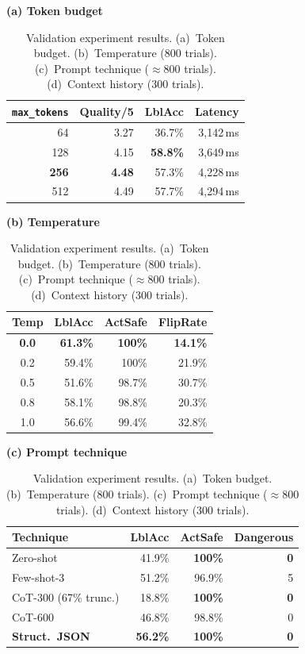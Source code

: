 \documentclass[journal]{IEEEtran}
\begin{document}
\begin{table}[t]
  \caption{Validation experiment results.
    (a)~Token budget. (b)~Temperature (800 trials).
    (c)~Prompt technique ($\approx$800 trials).
    (d)~Context history (300 trials).}
  \label{tab:validation}
  \centering
  \small
  \textbf{(a) Token budget}\vspace{2pt}\\
  \begin{tabular}{rrrr}
    \toprule
    \texttt{max\_tokens} & Quality/5 & LblAcc & Latency \\
    \midrule
    64           & 3.27 & 36.7\% & 3,142\,ms \\
    128          & 4.15 & \textbf{58.8\%} & 3,649\,ms \\
    \textbf{256} & \textbf{4.48} & 57.3\% & 4,228\,ms \\
    512          & 4.49 & 57.7\% & 4,294\,ms \\
    \bottomrule
  \end{tabular}\vspace{4pt}

  \textbf{(b) Temperature}\vspace{2pt}\\
  \begin{tabular}{crrr}
    \toprule
    Temp & LblAcc & ActSafe & FlipRate \\
    \midrule
    \textbf{0.0} & \textbf{61.3\%} & \textbf{100\%} & \textbf{14.1\%} \\
    0.2 & 59.4\% & 100\%  & 21.9\% \\
    0.5 & 51.6\% & 98.7\% & 30.7\% \\
    0.8 & 58.1\% & 98.8\% & 20.3\% \\
    1.0 & 56.6\% & 99.4\% & 32.8\% \\
    \bottomrule
  \end{tabular}\vspace{4pt}

  \textbf{(c) Prompt technique}\vspace{2pt}\\
  \begin{tabular}{lrrr}
    \toprule
    Technique & LblAcc & ActSafe & Dangerous \\
    \midrule
    Zero-shot              & 41.9\% & \textbf{100\%} & \textbf{0} \\
    Few-shot-3             & 51.2\% & 96.9\%         & 5 \\
    CoT-300 (67\% trunc.)  & 18.8\% & \textbf{100\%} & \textbf{0} \\
    CoT-600                & 46.8\% & 98.8\%         & 0 \\
    \textbf{Struct.\ JSON} & \textbf{56.2\%} & \textbf{100\%} & \textbf{0} \\
    \bottomrule
  \end{tabular}\vspace{4pt}


\end{table}
\end{document}
